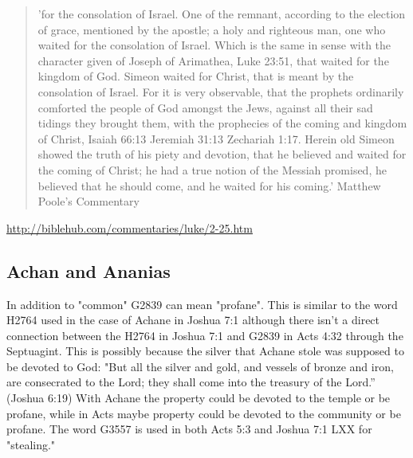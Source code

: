 \documentclass[11pt]{article}
\begin{document}
\begin{quote}
'for the consolation of Israel. One of the remnant, according to the election of grace, mentioned by the apostle; a holy and righteous man, one who waited for the consolation of Israel. Which is the same in sense with the character given of Joseph of Arimathea, Luke 23:51, that waited for the kingdom of God. Simeon waited for Christ, that is meant by the consolation of Israel. For it is very observable, that the prophets ordinarily comforted the people of God amongst the Jews, against all their sad tidings they brought them, with the prophecies of the coming and kingdom of Christ, Isaiah 66:13 Jeremiah 31:13 Zechariah 1:17. Herein old Simeon showed the truth of his piety and devotion, that he believed and waited for the coming of Christ; he had a true notion of the Messiah promised, he believed that he should come, and he waited for his coming.'\newline
Matthew Poole's Commentary
\end{quote}
\url{http://biblehub.com/commentaries/luke/2-25.htm}
\newline

\subsection{Achan and Ananias}
In addition to "common" G2839 can mean "profane".\cite{common faith} This is similar to the word H2764 used in the case of Achane in Joshua 7:1\cite{H2764 H2763} although there isn't a direct connection between the H2764 in Joshua 7:1 and G2839 in Acts 4:32 through the Septuagint.
This is possibly because the silver that Achane stole was supposed to be devoted to God: "But all the silver and gold, and vessels of bronze and iron, are consecrated to the Lord; they shall come into the treasury of the Lord.” (Joshua 6:19)
 With Achane the property could be devoted to the temple or be profane, while in Acts maybe property could be devoted to the community or be profane. The word G3557 is used in both Acts 5:3 and Joshua 7:1 LXX for "stealing." 
\end{document}
